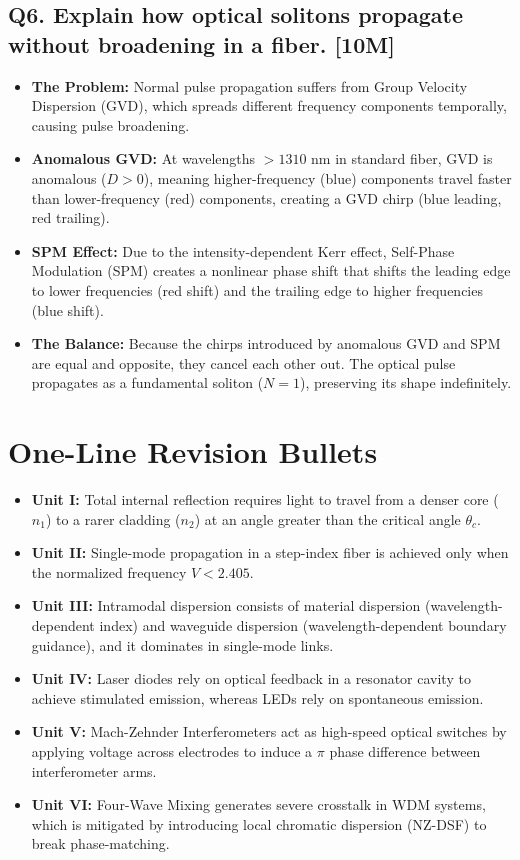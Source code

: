 \subsection{Q6. Explain how optical solitons propagate without broadening in a fiber. [10M]}
\begin{itemize}
  \item   \textbf{The Problem:} Normal pulse propagation suffers from Group Velocity Dispersion (GVD), which spreads different frequency components temporally, causing pulse broadening.
  \item   \textbf{Anomalous GVD:} At wavelengths $>1310\text{ nm}$ in standard fiber, GVD is anomalous ($D > 0$), meaning higher-frequency (blue) components travel faster than lower-frequency (red) components, creating a GVD chirp (blue leading, red trailing).
  \item   \textbf{SPM Effect:} Due to the intensity-dependent Kerr effect, Self-Phase Modulation (SPM) creates a nonlinear phase shift that shifts the leading edge to lower frequencies (red shift) and the trailing edge to higher frequencies (blue shift).
  \item   \textbf{The Balance:} Because the chirps introduced by anomalous GVD and SPM are equal and opposite, they cancel each other out. The optical pulse propagates as a fundamental soliton ($N=1$), preserving its shape indefinitely.
\end{itemize}


\section{One-Line Revision Bullets}

\begin{itemize}
  \item   \textbf{Unit I:} Total internal reflection requires light to travel from a denser core ($n_1$) to a rarer cladding ($n_2$) at an angle greater than the critical angle $\theta_c$.
  \item   \textbf{Unit II:} Single-mode propagation in a step-index fiber is achieved only when the normalized frequency $V < 2.405$.
  \item   \textbf{Unit III:} Intramodal dispersion consists of material dispersion (wavelength-dependent index) and waveguide dispersion (wavelength-dependent boundary guidance), and it dominates in single-mode links.
  \item   \textbf{Unit IV:} Laser diodes rely on optical feedback in a resonator cavity to achieve stimulated emission, whereas LEDs rely on spontaneous emission.
  \item   \textbf{Unit V:} Mach-Zehnder Interferometers act as high-speed optical switches by applying voltage across electrodes to induce a $\pi$ phase difference between interferometer arms.
  \item   \textbf{Unit VI:} Four-Wave Mixing generates severe crosstalk in WDM systems, which is mitigated by introducing local chromatic dispersion (NZ-DSF) to break phase-matching.
\end{itemize}
